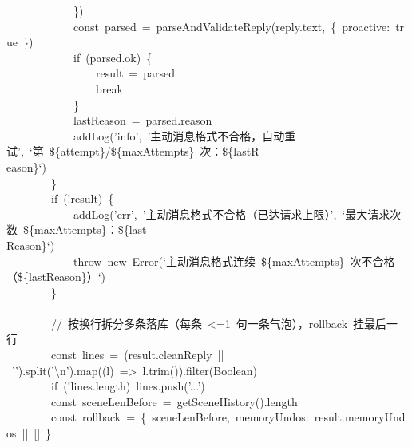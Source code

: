 \documentclass[a4paper,10pt]{article}
\begin{document}
{~~~~~~~~~~~~\})\\
~~~~~~~~~~~~const~parsed~=~parseAndValidateReply(reply.text,~\{~proactive:~true~\})\\
~~~~~~~~~~~~if~(parsed.ok)~\{\\
~~~~~~~~~~~~~~~~result~=~parsed\\
~~~~~~~~~~~~~~~~break\\
~~~~~~~~~~~~\}\\
~~~~~~~~~~~~lastReason~=~parsed.reason\\
~~~~~~~~~~~~addLog('info',~'主动消息格式不合格，自动重试',~`第~\$\{attempt\}/\$\{maxAttempts\}~次：\$\{lastR\\
eason\}`)\\
~~~~~~~~\}\\
~~~~~~~~if~(!result)~\{\\
~~~~~~~~~~~~addLog('err',~'主动消息格式不合格（已达请求上限）',~`最大请求次数~\$\{maxAttempts\}：\$\{last\\
Reason\}`)\\
~~~~~~~~~~~~throw~new~Error(`主动消息格式连续~\$\{maxAttempts\}~次不合格（\$\{lastReason\}）`)\\
~~~~~~~~\}\\
\mbox{}\\
~~~~~~~~//~按换行拆分多条落库（每条~<=1~句一条气泡），rollback~挂最后一行\\
~~~~~~~~const~lines~=~(result.cleanReply~||~'').split('\textbackslash{}n').map((l)~=>~l.trim()).filter(Boolean)\\
~~~~~~~~if~(!lines.length)~lines.push('...')\\
~~~~~~~~const~sceneLenBefore~=~getSceneHistory().length\\
~~~~~~~~const~rollback~=~\{~sceneLenBefore,~memoryUndos:~result.memoryUndos~||~[]~\}
}

\newpage
\end{document}
